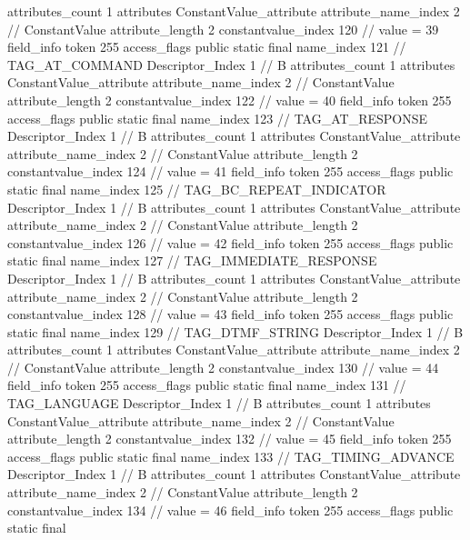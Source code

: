 {{{{{				attributes_count	1
				attributes {
				ConstantValue_attribute {
					attribute_name_index	2		// ConstantValue
					attribute_length	2
					constantvalue_index	120		// value = 39
				}
				}
			}
			field_info {
				token	255
				access_flags	public static final
				name_index	121		// TAG_AT_COMMAND
				Descriptor_Index	1		// B
				attributes_count	1
				attributes {
				ConstantValue_attribute {
					attribute_name_index	2		// ConstantValue
					attribute_length	2
					constantvalue_index	122		// value = 40
				}
				}
			}
			field_info {
				token	255
				access_flags	public static final
				name_index	123		// TAG_AT_RESPONSE
				Descriptor_Index	1		// B
				attributes_count	1
				attributes {
				ConstantValue_attribute {
					attribute_name_index	2		// ConstantValue
					attribute_length	2
					constantvalue_index	124		// value = 41
				}
				}
			}
			field_info {
				token	255
				access_flags	public static final
				name_index	125		// TAG_BC_REPEAT_INDICATOR
				Descriptor_Index	1		// B
				attributes_count	1
				attributes {
				ConstantValue_attribute {
					attribute_name_index	2		// ConstantValue
					attribute_length	2
					constantvalue_index	126		// value = 42
				}
				}
			}
			field_info {
				token	255
				access_flags	public static final
				name_index	127		// TAG_IMMEDIATE_RESPONSE
				Descriptor_Index	1		// B
				attributes_count	1
				attributes {
				ConstantValue_attribute {
					attribute_name_index	2		// ConstantValue
					attribute_length	2
					constantvalue_index	128		// value = 43
				}
				}
			}
			field_info {
				token	255
				access_flags	public static final
				name_index	129		// TAG_DTMF_STRING
				Descriptor_Index	1		// B
				attributes_count	1
				attributes {
				ConstantValue_attribute {
					attribute_name_index	2		// ConstantValue
					attribute_length	2
					constantvalue_index	130		// value = 44
				}
				}
			}
			field_info {
				token	255
				access_flags	public static final
				name_index	131		// TAG_LANGUAGE
				Descriptor_Index	1		// B
				attributes_count	1
				attributes {
				ConstantValue_attribute {
					attribute_name_index	2		// ConstantValue
					attribute_length	2
					constantvalue_index	132		// value = 45
				}
				}
			}
			field_info {
				token	255
				access_flags	public static final
				name_index	133		// TAG_TIMING_ADVANCE
				Descriptor_Index	1		// B
				attributes_count	1
				attributes {
				ConstantValue_attribute {
					attribute_name_index	2		// ConstantValue
					attribute_length	2
					constantvalue_index	134		// value = 46
				}
				}
			}
			field_info {
				token	255
				access_flags	public static final
}}}}}
